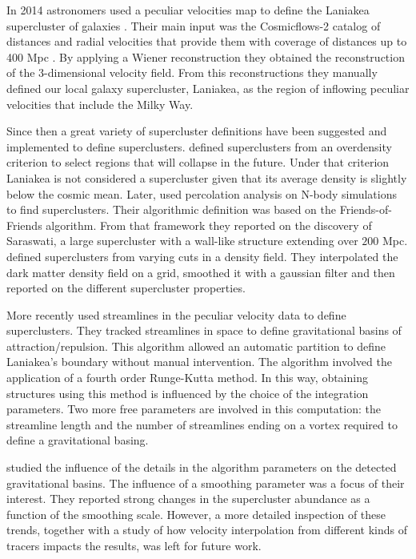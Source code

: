 \documentclass[usenatbib]{mnras}
\begin{document}
In 2014 astronomers used a peculiar velocities map  to 
define the Laniakea supercluster of galaxies
\citep{2014Natur.513...71T}.  
Their main input was the Cosmicflows-2 catalog of distances and radial
velocities that provide them with coverage of distances up to 400 Mpc
\citep{2013AJ....146...86T}. 
By applying a Wiener reconstruction  \citep{Zaroubi_1999} they obtained the
reconstruction of the 3-dimensional velocity field. 
From this reconstructions they manually defined our local galaxy supercluster, Laniakea, as the region of inflowing peculiar velocities that include the Milky Way. 

Since then a great variety of supercluster definitions have been suggested and implemented to define superclusters. 
\cite{2015A&A...575L..14C} defined superclusters from an overdensity criterion to select regions that will collapse in the future.
Under that criterion Laniakea is not considered a supercluster given that its average density is slightly below the cosmic mean.
Later, \cite{Bagchi_2017} used percolation analysis on N-body simulations to find superclusters. 
Their algorithmic definition was based on the Friends-of-Friends algorithm.
From that framework they reported on the discovery of Saraswati, a large supercluster with a wall-like structure extending over $200$ Mpc.
\cite{Einasto_2019} defined superclusters from varying cuts in a density field. 
They interpolated the dark matter density field on a grid, smoothed it with a gaussian filter and then reported on the different supercluster properties.

More recently \cite{Dupuy_2019} used streamlines in the peculiar velocity data to define 
superclusters. 
They tracked streamlines in space to define gravitational basins of attraction/repulsion.
This algorithm allowed an automatic partition to define Laniakea's boundary without manual intervention.
The algorithm involved the application of a
fourth order Runge-Kutta method. 
In this way, obtaining structures using this method is influenced by the choice of the integration parameters. 
Two more free parameters are involved in this computation: the streamline length and the number of streamlines ending on a vortex required to define a gravitational basing.

\cite{Dupuy_2020} studied the influence of the details in
the algorithm parameters on the detected gravitational basins.
The influence of a smoothing parameter was a focus of their interest. 
They reported strong changes in the supercluster abundance as a function of the smoothing scale.
However, a more detailed inspection of these trends, together with a study of how velocity interpolation from different kinds of tracers impacts the results, was left for future work.
\end{document}
